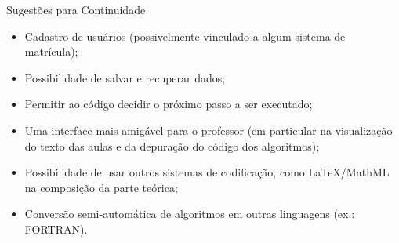 \documentclass{beamer}
\begin{document}
\begin{frame}{Sugestões para Continuidade}
	\begin{itemize}
		\item Cadastro de usuários (possivelmente vinculado a algum sistema de matrícula);
		\item Possibilidade de salvar e recuperar dados;
		\item Permitir ao código decidir o próximo passo a ser executado;
		\item Uma interface mais amigável para o professor (em particular na visualização do texto das aulas e da depuração do código dos algoritmos);
		\item Possibilidade de usar outros sistemas de codificação, como \LaTeX  /MathML na composição da parte teórica;
		\item Conversão semi-automática de algoritmos em outras linguagens (ex.: FORTRAN).
	\end{itemize}
\end{frame}

\begin{frame}
\begin{center}
\end{center}
\end{frame}
\end{document}
